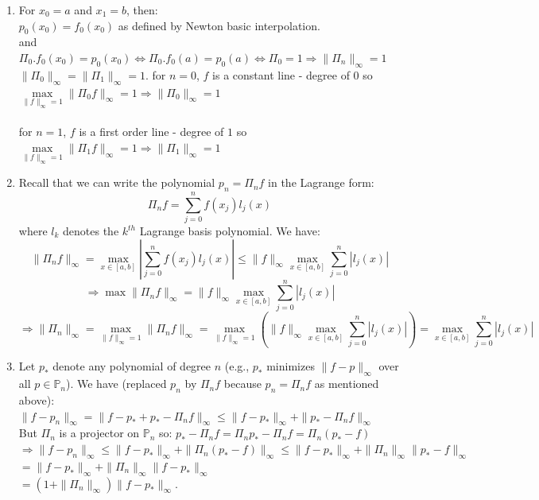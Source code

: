 \documentclass[14pt,a4paper]{article}
\begin{document}
\begin{enumerate}
	
	\label{3b}
	\item For $x_0 = a$ and $x_1 = b$, then:\\
	$ p_0(x_0) = f_0(x_0)$ as defined by Newton basic interpolation.\\
	and $\Pi_0.f_0(x_0) = p_0(x_0) \Leftrightarrow \Pi_0.f_0(a) = p_0(a) \Leftrightarrow \Pi_0 =1 \Rightarrow \|\Pi_n\|_{\infty} =1$ \\
	 $\|\Pi_0\|_{\infty} = \|\Pi_1\|_{\infty} =1$.
	for $n = 0$, $f$ is a constant line - degree of $0$ so $\max\limits_{\|f\|_{\infty} =1} \|\Pi_0f\|_{\infty} =1 \Rightarrow  \|\Pi_0\|_{\infty} = 1$\\
	\vspace{4cm}\\
	for $n = 1$, $f$ is a first order line - degree of $1$ so $\max\limits_{\|f\|_{\infty} =1} \|\Pi_1f\|_{\infty} =1 \Rightarrow  \|\Pi_1\|_{\infty} = 1$\\
	\label{3c}
	\item Recall that we can write the polynomial $p_n = \Pi_nf$ in the Lagrange form:
	\hspace*{5cm} $$\Pi_nf = \sum_{j=0}^{n}f(x_j)l_j(x)$$
	where $l_k$ denotes the $k^{th}$ Lagrange basis polynomial. We have:\\
	$$\|\Pi_nf\|_{\infty} = \max \limits_{x \in [a,b]} \left| \sum_{j=0}^{n} f(x_j)l_j(x) \right| \leq \|f\|_{\infty} \max \limits_{x \in [a,b]} \sum_{j=0}^{n}|l_j(x)|$$
	$$ \Rightarrow \max \|\Pi_nf\|_{\infty} = \|f\|_{\infty} \max \limits_{x \in [a,b]} \sum_{j=0}^{n}|l_j(x)|$$
	$$ \Rightarrow \|\Pi_n\|_{\infty} = \max\limits_{\|f\|_{\infty}=1} \|\Pi_nf\|_{\infty} = \max \limits_{\|f\|_{\infty}=1} \left( \|f\|_{\infty} \max \limits_{x \in [a,b]} \sum_{j=0}^{n}|l_j(x)| \right) = \max \limits_{x \in [a,b]} \sum_{j=0}^{n}|l_j(x)| $$
	
	\label{3d}
	\item Let $p_*$ denote any polynomial of degree $n$ (e.g., $p_*$ minimizes $\|f-p\|_{\infty}$ over all $p \in \mathbb{P}_n$). We have (replaced $p_n$ by $\Pi_n f$ because $p_n = \Pi_n f$ as mentioned above): \\
	$\|f-p_n\|_{\infty} = \|f-p_* + p_* - \Pi_n f\|_{\infty} \leq \|f-p_*\|_{\infty} + \|p_* - \Pi_n f\|_{\infty}$ \\
	But $\Pi_n$ is a projector on $\mathbb{P}_n$ so: $p_* - \Pi_n f = \Pi_n p_* - \Pi_n f = \Pi_n(p_* -f)$ \\
	$\Rightarrow \|f-p_n\|_{\infty} \leq \|f-p_*\|_{\infty} + \|\Pi_n(p_* - f)\|_{\infty} \leq \|f-p_*\|_{\infty} + \|\Pi_n\|_{\infty}\|p_* - f\|_{\infty} $ \\
	\hspace*{8.1cm} $ = \|f-p_*\|_{\infty} + \|\Pi_n\|_{\infty}\|f -p_*\|_{\infty} $ \\
	\hspace*{8.1cm} $ = (1+ \|\Pi_n\|_{\infty})\|f-p_*\|_{\infty}$.\\
	

\end{enumerate}
\end{document}
